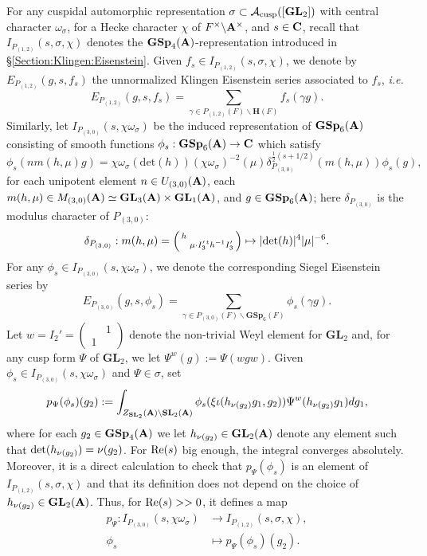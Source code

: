 \documentclass[11pt, reqno]{amsart}
\theoremstyle{plain}
\theoremstyle{definition}
\theoremstyle{remark}
\theoremstyle{plain}
\def\C{{\bf C}}
\def\H{{H}}
\def\SL{{\mathbf{SL}}}
\def\A{{\bf A}}
\def\H{\mathbf{H}}
\def\GSp{{\mathbf{GSp}}}
\def\GL{\mathbf{GL}}
\begin{document}
For any cuspidal automorphic representation $\sigma \subset \mathcal{A}_{\rm cusp}([\GL_2])$ with central character $\omega_\sigma$, for a Hecke character $\chi$ of $F^\times \backslash \A^\times$, and $s \in \C$, recall that 
$I_{P_{(1,2)}}(s,\sigma, \chi)$ denotes the $\GSp_4(\A)$-representation introduced in \S \ref{Section:Klingen:Eisenstein}. Given $f_s \in I_{P_{(1,2)}}(s,\sigma,\chi)$, we denote by $E_{P_{(1,2)}}(g,s,f_s)$ the unnormalized Klingen Eisenstein series associated to  $f_s$, \textit{i.e.} $$  E_{P_{(1,2)}}(g,s, f_s) ={\sum_{\gamma \in {P_{(1,2)}}(F) \backslash \H(F)}} f_s(\gamma g).$$
Similarly, let  $I_{P_{(3,0)}}\left(s , \chi\omega_\sigma \right)$ be the induced representation of $\GSp_{6}(\A)$ consisting of smooth functions $\phi_{s}:\GSp_{6}(\A)\to\C$ which satisfy
\begin{equation}\label{induction:Siegel}\phi_{s}(n m(h,\mu) g) =\chi\omega_\sigma(\mathrm{det}(h))(\chi\omega_\sigma)^{-2}(\mu)\delta_{P_{(3,0)}}^{\frac{1}{2}(s+1/2)}(m(h,\mu))\phi_{s}(g),\end{equation}
for each unipotent element $n \in U_{(3,0)}(\A)$, each $m(h,\mu) \in M_{(3,0)}(\A) \simeq \GL_3(\A) \times \GL_1(\A)$, and $g \in \GSp_6(\A)$; here $\delta_{P_{(3,0)}}$ is the modulus character of $P_{(3,0)}$: 
\[\delta_{P_{(3,0)}}: m(h,\mu) = \left( \begin{smallmatrix} h & \\ & \mu \cdot I_3' {}^th^{-1} I_3'
\end{smallmatrix} \right)     \mapsto |{\rm det}(h)|^4 |\mu|^{-6}. 
 \]
For any $\phi_s\in I_{P_{(3,0)}}\left(s , \chi\omega_\sigma \right)$, we denote the corresponding Siegel Eisenstein series by
\[E_{P_{(3,0)}}\left(g,s,\phi_s\right) ={\sum_{\gamma \in {P_{(3,0)}}(F) \backslash \GSp_6(F)}} \phi_s(\gamma g).\] 
Let $w= I_2' = \left( \begin{smallmatrix}
    &1 \\ 1 & 
\end{smallmatrix}\right)$ denote the non-trivial Weyl element for $\GL_2$ and, for any cusp form $\Psi$ of $\GL_2$, we let $\Psi^w(g):= \Psi(w g w)$. Given $\phi_s \in I_{P_{(3,0)}}(s ,\chi \omega_\sigma)$ and $\Psi \in \sigma$, set
$$ p_\Psi(\phi_s)(g_2) := \int_{Z_{\SL_2}(\A)\backslash \SL_2(\A)}\phi_s(\xi\iota(h_{\nu(g_2)} g_1,g_2))\Psi^w(h_{\nu(g_2)} g_1)dg_1,$$
where for each $g_2 \in \GSp_4(\A)$ we let $h_{\nu(g_2)} \in \GL_2(\A)$ denote any element such that ${\rm det}(h_{\nu(g_2)}) = {\nu(g_2)}$. For ${\rm Re}(s)$ big enough, the integral converges absolutely. Moreover, it is a direct calculation to check that $p_\Psi(\phi_s)$ is an element of $I_{P_{(1,2)}}(s,\sigma,\chi)$ and that its definition does not depend on the choice of $h_{\nu(g_2)} \in \GL_2(\A)$. Thus, for ${\rm Re}(s)>>0$, it defines a map
\begin{align}
    p_\Psi:I_{P_{(3,0)}}(s ,\chi \omega_\sigma) & \to I_{P_{(1,2)}}(s,\sigma,\chi),\label{PullbackMapRepresentation}\\ 
    \phi_s&\mapsto p_\Psi(\phi_s)(g_2).\nonumber
\end{align}
\end{document}

